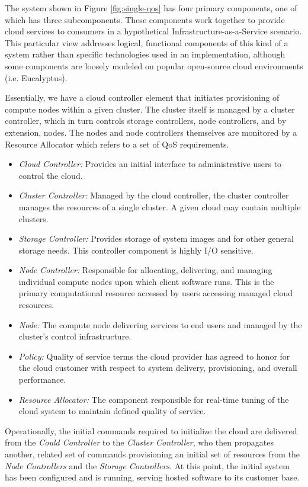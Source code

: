 \documentclass[times, 10pt,twocolumn]{article}
\begin{document}
The system shown in Figure \ref{fig:single-qos} has four primary components, one of which has three subcomponents.  These components work together to provide cloud services to consumers in a hypothetical Infrastructure-as-a-Service scenario.  This particular view addresses logical, functional components of this kind of a system rather than specific technologies used in an implementation, although some components are loosely modeled on popular open-source cloud environments (i.e. Eucalyptus).

Essentially, we have a cloud controller element that initiates provisioning of compute nodes within a given cluster. The cluster itself is managed by a cluster controller, which in turn controls storage controllers, node controllers, and by extension, nodes.  The nodes and node controllers themselves are monitored by a Resource Allocator which refers to a set of QoS requirements.

\begin{itemize}
\item \textit{Cloud Controller:} Provides an initial interface to administrative users to control the cloud.
\item \textit{Cluster Controller:} Managed by the cloud controller, the cluster controller manages the resources of a single cluster. A given cloud may contain multiple clusters.
\item \textit{Storage Controller:} Provides storage of system images and for other general storage needs.  This controller component is highly I/O sensitive.
\item \textit{Node Controller:} Responsible for allocating, delivering, and managing individual compute nodes upon which client software runs.  This is the primary computational resource accessed by users accessing managed cloud resources.
\item \textit{Node:} The compute node delivering services to end users and managed by the cluster's control infrastructure.
\item \textit{Policy:} Quality of service terms the cloud provider has agreed to honor for the cloud customer with respect to system delivery, provisioning, and overall performance.
\item \textit{Resource Allocator:} The component responsible for real-time tuning of the cloud system to maintain defined quality of service.
\end{itemize}

Operationally, the initial commands required to initialize the cloud are delivered from the \textit{Could Controller} to the \textit{Cluster Controller}, who then propagates another, related set of commands provisioning an initial set of resources from the \textit{Node Controllers} and the \textit{Storage Controllers}.  At this point, the initial system has been configured and is running, serving hosted software to its customer base.
\end{document}
